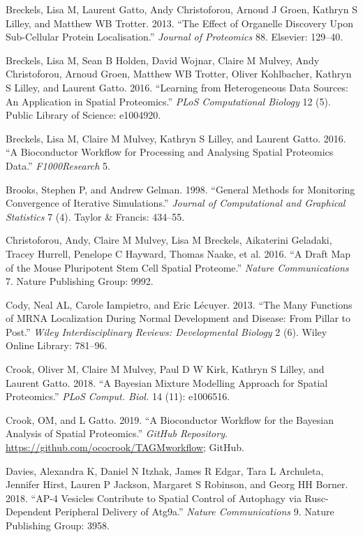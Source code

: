 \documentclass[]{article}
\begin{document}
\hypertarget{ref-Breckels:2013}{}
Breckels, Lisa M, Laurent Gatto, Andy Christoforou, Arnoud J Groen,
Kathryn S Lilley, and Matthew WB Trotter. 2013. ``The Effect of
Organelle Discovery Upon Sub-Cellular Protein Localisation.''
\emph{Journal of Proteomics} 88. Elsevier: 129--40.

\hypertarget{ref-Breckels:2016}{}
Breckels, Lisa M, Sean B Holden, David Wojnar, Claire M Mulvey, Andy
Christoforou, Arnoud Groen, Matthew WB Trotter, Oliver Kohlbacher,
Kathryn S Lilley, and Laurent Gatto. 2016. ``Learning from Heterogeneous
Data Sources: An Application in Spatial Proteomics.'' \emph{PLoS
Computational Biology} 12 (5). Public Library of Science: e1004920.

\hypertarget{ref-Breckels:2016b}{}
Breckels, Lisa M, Claire M Mulvey, Kathryn S Lilley, and Laurent Gatto.
2016. ``A Bioconductor Workflow for Processing and Analysing Spatial
Proteomics Data.'' \emph{F1000Research} 5.

\hypertarget{ref-Brooks:1998}{}
Brooks, Stephen P, and Andrew Gelman. 1998. ``General Methods for
Monitoring Convergence of Iterative Simulations.'' \emph{Journal of
Computational and Graphical Statistics} 7 (4). Taylor \& Francis:
434--55.

\hypertarget{ref-hyper}{}
Christoforou, Andy, Claire M Mulvey, Lisa M Breckels, Aikaterini
Geladaki, Tracey Hurrell, Penelope C Hayward, Thomas Naake, et al. 2016.
``A Draft Map of the Mouse Pluripotent Stem Cell Spatial Proteome.''
\emph{Nature Communications} 7. Nature Publishing Group: 9992.

\hypertarget{ref-Cody:2013}{}
Cody, Neal AL, Carole Iampietro, and Eric Lécuyer. 2013. ``The Many
Functions of MRNA Localization During Normal Development and Disease:
From Pillar to Post.'' \emph{Wiley Interdisciplinary Reviews:
Developmental Biology} 2 (6). Wiley Online Library: 781--96.

\hypertarget{ref-Crook:2018}{}
Crook, Oliver M, Claire M Mulvey, Paul D W Kirk, Kathryn S Lilley, and
Laurent Gatto. 2018. ``A Bayesian Mixture Modelling Approach for Spatial
Proteomics.'' \emph{PLoS Comput. Biol.} 14 (11): e1006516.

\hypertarget{ref-ghrepo}{}
Crook, OM, and L Gatto. 2019. ``A Bioconductor Workflow for the Bayesian
Analysis of Spatial Proteomics.'' \emph{GitHub Repository}.
\url{https://github.com/ococrook/TAGMworkflow}; GitHub.

\hypertarget{ref-Davies:2018}{}
Davies, Alexandra K, Daniel N Itzhak, James R Edgar, Tara L Archuleta,
Jennifer Hirst, Lauren P Jackson, Margaret S Robinson, and Georg HH
Borner. 2018. ``AP-4 Vesicles Contribute to Spatial Control of Autophagy
via Rusc-Dependent Peripheral Delivery of Atg9a.'' \emph{Nature
Communications} 9. Nature Publishing Group: 3958.
\end{document}
